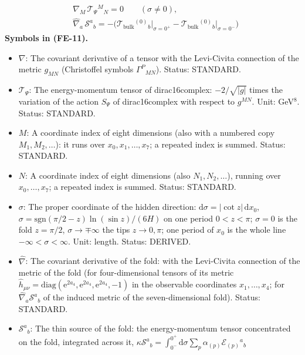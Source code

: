 \documentclass[
  10pt,
]{article}
\providecommand{\tightlist}{%
  \setlength{\itemsep}{0pt}\setlength{\parskip}{0pt}}
\begin{document}
\[
\begin{aligned}
&\nabla_M\,\mathcal{T}_\Psi{}^M{}_N = 0\qquad (\sigma \ne 0),\\
&\hat\nabla_a\,\mathcal{S}^a{}_b = -\Big(\mathcal{T}_{\mathrm{bulk}}{}^{(0)}{}_b\big\vert_{\sigma=0^+}
 - \mathcal{T}_{\mathrm{bulk}}{}^{(0)}{}_b\big\vert_{\sigma=0^-}\Big)
\end{aligned} \tag{FE-11}
\] \textbf{Symbols in (FE-11).}

\begin{itemize}
\tightlist
\item
  \(\nabla\): The covariant derivative of a tensor with the Levi-Civita
  connection of the metric \(g_{MN}\) (Christoffel symbols
  \(\Gamma^P{}_{MN}\)). Status: STANDARD.
\item
  \(\mathcal{T}_\Psi\): The energy-momentum tensor of dirac16complex:
  \(-2/\sqrt{\lvert g\rvert}\) times the variation of the action
  \(S_\Psi\) of dirac16complex with respect to \(g^{MN}\). Unit:
  GeV\(^8\). Status: STANDARD.
\item
  \(M\): A coordinate index of eight dimensions (also with a numbered
  copy \(M_1, M_2, \dots\)): it runs over \(x_0, x_1, \dots, x_7\); a
  repeated index is summed. Status: STANDARD.
\item
  \(N\): A coordinate index of eight dimensions (also
  \(N_1, N_2, \dots\)), running over \(x_0, \dots, x_7\); a repeated
  index is summed. Status: STANDARD.
\item
  \(\sigma\): The proper coordinate of the hidden direction:
  \(\mathrm{d}\sigma = \lvert\cot z\rvert\,\mathrm{d}x_0\),
  \(\sigma = \mathrm{sgn}(\pi/2 - z)\ln(\sin z)/(6H)\) on one period
  \(0 < z < \pi\); \(\sigma = 0\) is the fold \(z = \pi/2\),
  \(\sigma \to \mp\infty\) the tips \(z \to 0, \pi\); one period of
  \(x_0\) is the whole line \(-\infty < \sigma < \infty\). Unit: length.
  Status: DERIVED.
\item
  \(\hat\nabla\): The covariant derivative of the fold: with the
  Levi-Civita connection of the metric of the fold (for four-dimensional
  tensors of its metric
  \(\hat h_{\mu\nu} = \mathrm{diag}(\mathrm{e}^{2a_4}, \mathrm{e}^{2a_4}, \mathrm{e}^{2a_4}, -1)\)
  in the observable coordinates \(x_1, \dots, x_4\); for
  \(\hat\nabla_a\mathcal{S}^a{}_b\) of the induced metric of the
  seven-dimensional fold). Status: STANDARD.
\item
  \(\mathcal{S}^a{}_b\): The thin source of the fold: the
  energy-momentum tensor concentrated on the fold, integrated across it,
  \(\kappa\mathcal{S}^a{}_b = \int_{0^-}^{0^+}\mathrm{d}\sigma\sum_p\alpha_{(p)}\mathcal{E}_{(p)}{}^a{}_b\)

\end{itemize}
\end{document}
